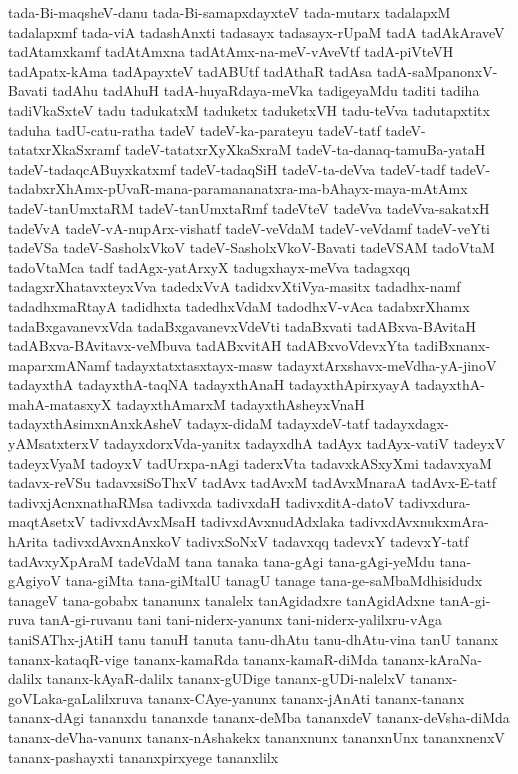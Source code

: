 {tada-Bi-maqsheV-danu
tada-Bi-samapxdayxteV
tada-mutarx
tadalapxM
tadalapxmf
tada-viA
tadashAnxti
tadasayx
tadasayx-rUpaM
tadA
tadAkAraveV
tadAtamxkamf
tadAtAmxna
tadAtAmx-na-meV-vAveVtf
tadA-piVteVH
tadApatx-kAma
tadApayxteV
tadABUtf
tadAthaR
tadAsa
tadA-saMpanonxV-Bavati
tadAhu
tadAhuH
tadA-huyaRdaya-meVka
tadigeyaMdu
taditi
tadiha
tadiVkaSxteV
tadu
tadukatxM
taduketx
taduketxVH
tadu-teVva
tadutapxtitx
taduha
tadU-catu-ratha
tadeV
tadeV-ka-parateyu
tadeV-tatf
tadeV-tatatxrXkaSxramf
tadeV-tatatxrXyXkaSxraM
tadeV-ta-danaq-tamuBa-yataH
tadeV-tadaqcABuyxkatxmf
tadeV-tadaqSiH
tadeV-ta-deVva
tadeV-tadf
tadeV-tadabxrXhAmx-pUvaR-mana-paramananatxra-ma-bAhayx-maya-mAtAmx
tadeV-tanUmxtaRM
tadeV-tanUmxtaRmf
tadeVteV
tadeVva
tadeVva-sakatxH
tadeVvA
tadeV-vA-nupArx-vishatf
tadeV-veVdaM
tadeV-veVdamf
tadeV-veYti
tadeVSa
tadeV-SasholxVkoV
tadeV-SasholxVkoV-Bavati
tadeVSAM
tadoVtaM
tadoVtaMca
tadf
tadAgx-yatArxyX
tadugxhayx-meVva
tadagxqq
tadagxrXhatavxteyxVva
tadedxVvA
tadidxvXtiVya-masitx
tadadhx-namf
tadadhxmaRtayA
tadidhxta
tadedhxVdaM
tadodhxV-vAca
tadabxrXhamx
tadaBxgavanevxVda
tadaBxgavanevxVdeVti
tadaBxvati
tadABxva-BAvitaH
tadABxva-BAvitavx-veMbuva
tadABxvitAH
tadABxvoVdevxYta
tadiBxnanx-maparxmANamf
tadayxtatxtasxtayx-masw
tadayxtArxshavx-meVdha-yA-jinoV
tadayxthA
tadayxthA-taqNA
tadayxthAnaH
tadayxthApirxyayA
tadayxthA-mahA-matasxyX
tadayxthAmarxM
tadayxthAsheyxVnaH
tadayxthAsimxnAnxkAsheV
tadayx-didaM
tadayxdeV-tatf
tadayxdagx-yAMsatxterxV
tadayxdorxVda-yanitx
tadayxdhA
tadAyx
tadAyx-vatiV
tadeyxV
tadeyxVyaM
tadoyxV
tadUrxpa-nAgi
taderxVta
tadavxkASxyXmi
tadavxyaM
tadavx-reVSu
tadavxsiSoThxV
tadAvx
tadAvxM
tadAvxMnaraA
tadAvx-E-tatf
tadivxjAcnxnathaRMsa
tadivxda
tadivxdaH
tadivxditA-datoV
tadivxdura-maqtAsetxV
tadivxdAvxMsaH
tadivxdAvxnudAdxlaka
tadivxdAvxnukxmAra-hArita
tadivxdAvxnAnxkoV
tadivxSoNxV
tadavxqq
tadevxY
tadevxY-tatf
tadAvxyXpAraM
tadeVdaM
tana
tanaka
tana-gAgi
tana-gAgi-yeMdu
tana-gAgiyoV
tana-giMta
tana-giMtalU
tanagU
tanage
tana-ge-saMbaMdhisidudx
tanageV
tana-gobabx
tananunx
tanalelx
tanAgidadxre
tanAgidAdxne
tanA-gi-ruva
tanA-gi-ruvanu
tani
tani-niderx-yanunx
tani-niderx-yalilxru-vAga
taniSAThx-jAtiH
tanu
tanuH
tanuta
tanu-dhAtu
tanu-dhAtu-vina
tanU
tananx
tananx-kataqR-vige
tananx-kamaRda
tananx-kamaR-diMda
tananx-kAraNa-dalilx
tananx-kAyaR-dalilx
tananx-gUDige
tananx-gUDi-nalelxV
tananx-goVLaka-gaLalilxruva
tananx-CAye-yanunx
tananx-jAnAti
tananx-tananx
tananx-dAgi
tananxdu
tananxde
tananx-deMba
tananxdeV
tananx-deVsha-diMda
tananx-deVha-vanunx
tananx-nAshakekx
tananxnunx
tananxnUnx
tananxnenxV
tananx-pashayxti
tananxpirxyege
tananxlilx
}
